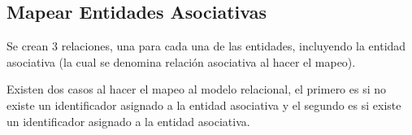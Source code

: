 \documentclass[12pt, fleqn]{report}                             %
\begin{document}
            \clearpage
            \subsection{Mapear Entidades Asociativas}

                Se crean 3 relaciones, una para cada una de las entidades, incluyendo la entidad asociativa
                (la cual se denomina relación asociativa al hacer el mapeo).

                Existen dos casos al hacer el mapeo al modelo relacional, el primero es si no existe un
                identificador asignado a la entidad asociativa y el segundo es si existe un identificador
                asignado a la entidad asociativa.
\end{document}
